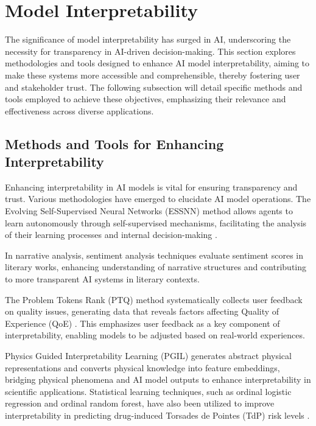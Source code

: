 \section{Model Interpretability} \label{sec:Model Interpretability}

The significance of model interpretability has surged in AI, underscoring the necessity for transparency in AI-driven decision-making. This section explores methodologies and tools designed to enhance AI model interpretability, aiming to make these systems more accessible and comprehensible, thereby fostering user and stakeholder trust. The following subsection will detail specific methods and tools employed to achieve these objectives, emphasizing their relevance and effectiveness across diverse applications.

\subsection{Methods and Tools for Enhancing Interpretability} \label{subsec:Methods and Tools for Enhancing Interpretability}

Enhancing interpretability in AI models is vital for ensuring transparency and trust. Various methodologies have emerged to elucidate AI model operations. The Evolving Self-Supervised Neural Networks (ESSNN) method allows agents to learn autonomously through self-supervised mechanisms, facilitating the analysis of their learning processes and internal decision-making \cite{le2019evolvingselfsupervisedneuralnetworks}. 

In narrative analysis, sentiment analysis techniques evaluate sentiment scores in literary works, enhancing understanding of narrative structures and contributing to more transparent AI systems in literary contexts. 

The Problem Tokens Rank (PTQ) method systematically collects user feedback on quality issues, generating data that reveals factors affecting Quality of Experience (QoE) \cite{gupchup2018analysisproblemtokensrank}. This emphasizes user feedback as a key component of interpretability, enabling models to be adjusted based on real-world experiences.

Physics Guided Interpretability Learning (PGIL) generates abstract physical representations and converts physical knowledge into feature embeddings, bridging physical phenomena and AI model outputs to enhance interpretability in scientific applications. Statistical learning techniques, such as ordinal logistic regression and ordinal random forest, have also been utilized to improve interpretability in predicting drug-induced Torsades de Pointes (TdP) risk levels \cite{xi2022statisticallearningpreclinicaldrug}.

